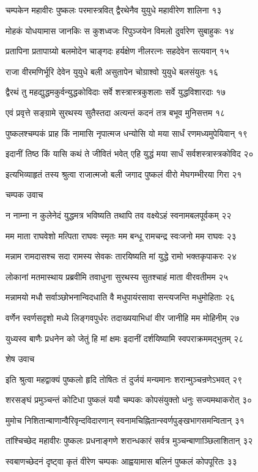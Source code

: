 चम्पकेन महावीरः पुष्कलः परमास्त्रवित्
द्वैरथेनैव युयुधे महावीरेण शालिना १३

मोहकं योधयामास जानकिः स कुशध्वजः
रिपुञ्जयेन विमलो दुर्वारेण सुबाहुकः १४

प्रतापिना प्रतापाग्र्यो बलमोदेन चाङ्गदः
हर्यक्षेण नीलरत्नः सहदेवेन सत्यवान् १५

राजा वीरमणिर्भूरि देवेन युयुधे बली
असुतापेन चोग्राश्वो युयुधे बलसंयुतः १६

द्वैरथं तु महद्युद्धमकुर्वन्युद्धकोविदाः
सर्वे शस्त्रास्त्रकुशलाः सर्वे युद्धविशारदाः १७

एवं प्रवृत्ते सङ्ग्रामे सुरथस्य सुतैस्तदा
अत्यन्तं कदनं तत्र बभूव मुनिसत्तम १८

पुष्कलश्चम्पकं प्राह किं नामासि नृपात्मज
धन्योसि यो मया सार्धं रणमध्यमुपेयिवान् १९

इदानीं तिष्ठ किं यासि कथं ते जीवितं भवेत्
एहि युद्धं मया सार्धं सर्वशस्त्रास्त्रकोविद २०

इत्यभिव्याहृतं तस्य श्रुत्वा राजात्मजो बली
जगाद पुष्कलं वीरो मेघगम्भीरया गिरा २१

चम्पक उवाच

न नाम्ना न कुलेनेदं युद्धमत्र भविष्यति
तथापि तव वक्ष्येऽहं स्वनामबलपूर्वकम् २२

मम माता राघवेशो मत्पिता राघवः स्मृतः
मम बन्धू रामचन्द्र स्वःजनो मम राघवः २३

मन्नाम रामदासश्च सदा रामस्य सेवकः
तारयिष्यति मां युद्धे रामो भक्तकृपाकरः २४

लोकानां मतमास्थाय प्रब्रवीमि तवाधुना
सुरथस्य सुतश्चाहं माता वीरवतीमम २५

मन्नामयो मधौ सर्वाञ्छोभनान्विदधाति वै
मधुपायंरसावा सन्त्यजन्ति मधुमोहिताः २६

वर्णेन स्वर्णसदृशो मध्ये लिङ्गवपुर्धरः
तदाख्ययाभिधां वीर जानीहि मम मोहिनीम् २७

युध्यस्व बाणैः प्रधनेन को जेतुं हि मां क्षमः
इदानीं दर्शयिष्यामि स्वपराक्रममद्भुतम् २८

शेष उवाच

इति श्रुत्वा महद्वाक्यं पुष्कलो हृदि तोषितः
तं दुर्जयं मन्यमानः शरान्मुञ्चन्रणेऽभवत् २९

शरसङ्घं प्रमुञ्चन्तं कोटिधा पुष्कलं ययौ
चम्पकः कोपसंयुक्तो धनुः सज्यमथाकरोत् ३०

मुमोच निशितान्बाणान्वैरिवृन्दविदारणान्
स्वनामचिह्नितान्स्वर्णपुङ्खभागसमन्वितान् ३१

तांश्चिच्छेद महावीरः पुष्कलः प्रधनाङ्गणे
शरान्धकारं सर्वत्र मुञ्चन्बाणाञ्छिलाशितान् ३२

स्वबाणच्छेदनं दृष्ट्वा कृतं वीरेण चम्पकः
आह्वयामास बलिनं पुष्कलं कोपपूरितः ३३

